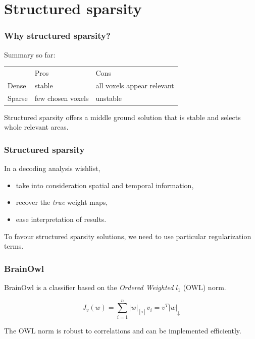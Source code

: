 \documentclass[11pt]{beamer}
\begin{document}
\section{Structured sparsity}
\label{sec:Structured sparsity}

\begin{frame}
    \frametitle{Why structured sparsity?}

    Summary so far:

    \begin{center}
        \begin{tabular}[h]{@{}lll@{}}
            & Pros & Cons \\
            \cmidrule(r){2-3}
            Dense & stable & all voxels appear relevant \\
            Sparse & few chosen voxels & unstable
        \end{tabular}
    \end{center} 
    
    \pause

    Structured sparsity offers a middle ground solution that is stable and
    selects whole relevant areas.

\end{frame}

\begin{frame}
    \frametitle{Structured sparsity}
    In a decoding analysis wishlist,
    \begin{itemize}
        \item take into consideration spatial and temporal information, \pause
        \item recover the \emph{true} weight maps, \pause
        \item ease interpretation of results. \pause
    \end{itemize}

    To favour structured sparsity solutions, we need to use particular
    regularization terms.

\end{frame}

\begin{frame}
    \frametitle{BrainOwl}
    BrainOwl is a classifier based on the \emph{Ordered Weighted} $l_1$
    (OWL) norm.

    \[J_v(w) = \sum_{i=1}^{n} |w|_{[i]} v_i = v^T |w|_{\downarrow}\]

    The OWL norm is robust to correlations and can be implemented efficiently.

\end{frame}
\end{document}
